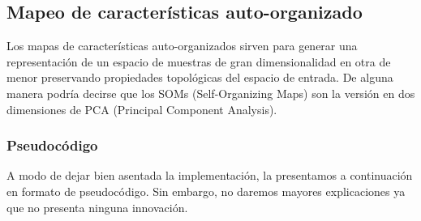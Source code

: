 \documentclass[informe.tex]{subfiles}
\begin{document}
	
	
	
    \subsection{Mapeo de características auto-organizado}
	Los mapas de características auto-organizados sirven para generar una representación de un espacio de muestras de gran dimensionalidad en otra de menor preservando propiedades topológicas del espacio de entrada. De alguna manera podr\'ia decirse que los SOMs (Self-Organizing Maps) son la versión en dos dimensiones de PCA (Principal Component Analysis).
	
	\newpage
	\subsubsection{Pseudoc\'odigo}
	
	A modo de dejar bien asentada la implementación, la presentamos a continuación en formato de pseudocódigo. Sin embargo, no daremos mayores explicaciones ya que no presenta ninguna innovación.
	
	\vspace{10pt}
	
\end{document}
